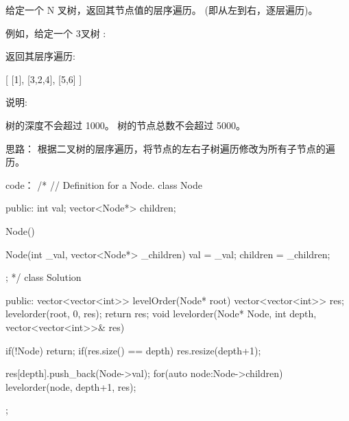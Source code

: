 给定一个 N 叉树，返回其节点值的层序遍历。 (即从左到右，逐层遍历)。

例如，给定一个 3叉树 :

 

 

返回其层序遍历:

[
     [1],
     [3,2,4],
     [5,6]
]

 

说明:

    树的深度不会超过 1000。
    树的节点总数不会超过 5000。



































思路：
根据二叉树的层序遍历，将节点的左右子树遍历修改为所有子节点的遍历。





















code：
/*
// Definition for a Node.
class Node {
public:
    int val;
    vector<Node*> children;

    Node() {}

    Node(int _val, vector<Node*> _children) {
        val = _val;
        children = _children;
    }
};
*/
class Solution {
public:
    vector<vector<int>> levelOrder(Node* root) {
        vector<vector<int>> res;
        levelorder(root, 0, res);
        return res;
    }
    void levelorder(Node* Node, int depth, vector<vector<int>>& res)
    {
        if(!Node) return;
        if(res.size() == depth)
            res.resize(depth+1);
        
        res[depth].push_back(Node->val);
        for(auto node:Node->children)
            levelorder(node, depth+1, res);
    }
};